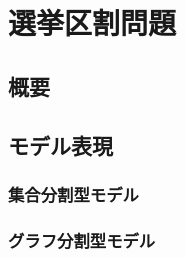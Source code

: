 \chapter{選挙区割問題} \label{chapter:2}

\section{概要}

\section{モデル表現}

\subsection{集合分割型モデル}

\subsection{グラフ分割型モデル}
